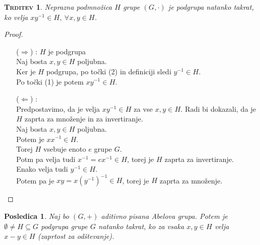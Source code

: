 \documentclass[a4paper,12pt]{article}
\newtheorem*{trditev}{\textsc{Trditev}}
\newtheorem*{posl}{Posledica}
\begin{document}
\begin{trditev}
Neprazna podmnožica $H$ grupe $(G,\cdot)$ je podgrupa natanko takrat, ko velja \linebreak $xy^{-1}\in H,~\forall x,y\in H$.\\
\end{trditev}


\begin{proof} ~~~
\begin{itemize}
\item[($\Rightarrow$)]: $H$ je podgrupa \\

Naj bosta $x,y\in H$ poljubna. \\

Ker je $H$ podgrupa, po točki (2) in definiciji sledi $y^{-1}\in H$. \\

Po točki (1) je potem $xy^{-1}\in H$.

\item[($\Leftarrow$)]: \\

Predpostavimo, da je velja $xy^{-1}\in H$ za vse $x,y\in H$. Radi bi dokazali, da je $H$ zaprta za množenje in za invertiranje. \\

Naj bosta $x,y\in H$ poljubna. \\

Potem je $xx^{-1}\in H$. \\

Torej $H$ vsebuje enoto $e$ grupe $G$. \\

Potm pa velja tudi $x^{-1}=ex^{-1}\in H$, torej je $H$ zaprta za invertiranje. \\

Enako velja tudi $y^{-1}\in H$. \\

Potem pa je  $xy=x(y^{-1})^{-1} \in H$, torej je $H$ zaprta za množenje. \\
\end{itemize}
\end{proof}

\begin{posl}
Naj bo $(G,+)$ aditivno pisana Abelova grupa. Potem je $\emptyset \neq H \subseteq G$ podgrupa grupe $G$ natanko takrat, ko za vsaka $x,y\in H$ velja $x-y\in H$ (zaprtost za odštevanje).\\
\end{posl}
\end{document}
